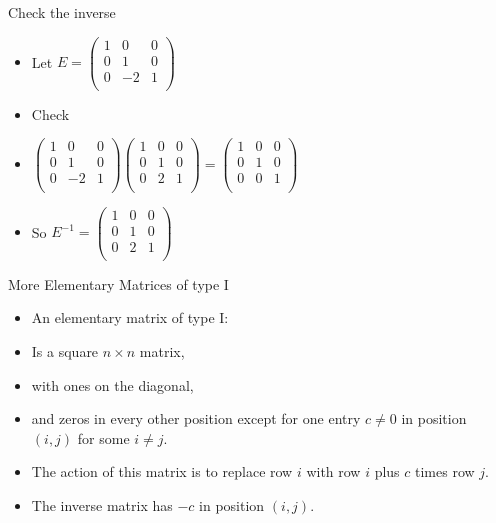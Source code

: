 \documentclass{beamer}
\begin{document}
\begin{frame}{Check the inverse}

\begin{itemize}
\item Let $E=
\begin{pmatrix}
1 & 0 & 0 \\
0 & 1 & 0 \\
0 & -2 & 1 \\
\end{pmatrix}
$
\item Check
\item $
\begin{pmatrix}
1 & 0 & 0 \\
0 & 1 & 0 \\
0 & -2 & 1 \\
\end{pmatrix}
\begin{pmatrix}
1 & 0 & 0 \\
0 & 1 & 0 \\
0 & 2 & 1 \\
\end{pmatrix}
=
\begin{pmatrix}
1 & 0 & 0 \\
0 & 1 & 0 \\
0 & 0 & 1 \\
\end{pmatrix}
$
\item So $E^{-1}=
\begin{pmatrix}
1 & 0 & 0 \\
0 & 1 & 0 \\
0 & 2 & 1 \\
\end{pmatrix}
$
\end{itemize}
\end{frame}

\begin{frame}{More Elementary Matrices of type I}

\begin{itemize}
\item An elementary matrix of type I:
\item Is a square $n\times n$ matrix,
\item with ones on the diagonal,
\item and zeros in every other position except for one entry $c\not=0$ in position $(i,j)$ for some $i\not=j$.
\item The action of this matrix is to replace row $i$ with row $i$ plus $c$ times row $j$.
\item The inverse matrix has $-c$ in position $(i,j)$.
\end{itemize}
\end{frame}
\end{document}
